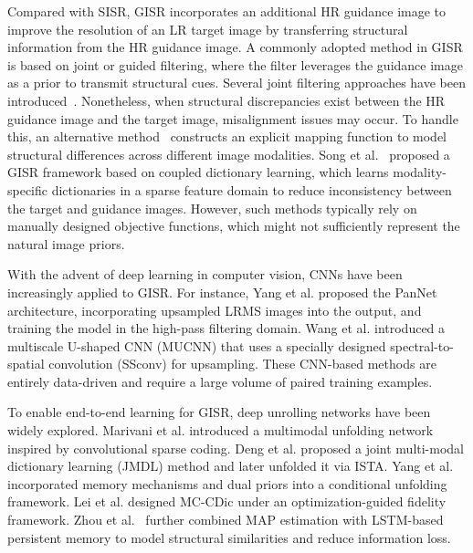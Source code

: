\documentclass[lettersize,journal]{IEEEtran}
\begin{document}
Compared with SISR, GISR incorporates an additional HR guidance image to improve the resolution of an LR target image by transferring structural information from the HR guidance image. A commonly adopted method in GISR is based on joint or guided filtering, where the filter leverages the guidance image as a prior to transmit structural cues. Several joint filtering approaches have been introduced~\cite{tomasi1998bilateral, kopf2007joint}. Nonetheless, when structural discrepancies exist between the HR guidance image and the target image, misalignment issues may occur. To handle this, an alternative method~\cite{shen2015multispectral} constructs an explicit mapping function to model structural differences across different image modalities. Song et al.~\cite{song2019multimodal} proposed a GISR framework based on coupled dictionary learning, which learns modality-specific dictionaries in a sparse feature domain to reduce inconsistency between the target and guidance images. However, such methods typically rely on manually designed objective functions, which might not sufficiently represent the natural image priors.

With the advent of deep learning in computer vision, CNNs have been increasingly applied to GISR. For instance, Yang et al.\cite{yang2017pannet} proposed the PanNet architecture, incorporating upsampled LRMS images into the output, and training the model in the high-pass filtering domain. Wang et al.\cite{wang2021ssconv} introduced a multiscale U-shaped CNN (MUCNN) that uses a specially designed spectral-to-spatial convolution (SSconv) for upsampling. These CNN-based methods are entirely data-driven and require a large volume of paired training examples.

To enable end-to-end learning for GISR, deep unrolling networks have been widely explored. Marivani et al.\cite{marivani2020multimodal} introduced a multimodal unfolding network inspired by convolutional sparse coding. Deng et al.\cite{deng2019deep} proposed a joint multi-modal dictionary learning (JMDL) method and later unfolded it via ISTA. Yang et al.\cite{yang2022memory} incorporated memory mechanisms and dual priors into a conditional unfolding framework. Lei et al.\cite{lei2023deep} designed MC-CDic under an optimization-guided fidelity framework. Zhou et al.~\cite{allinone_zhou2023memory} further combined MAP estimation with LSTM-based persistent memory to model structural similarities and reduce information loss.
\end{document}

